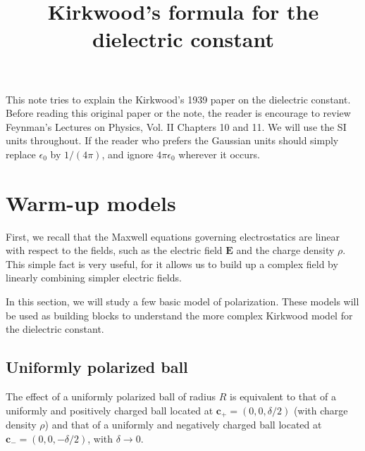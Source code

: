 \documentclass[11pt]{article}
\newcommand{\vct}[1]{\boldsymbol{\mathbf{#1}}}
\newcommand{\vE}{\vct{E}}
\begin{document}
\title{Kirkwood's formula for the dielectric constant}
\author{ \vspace{-10ex} }
\date{ \vspace{-10ex} }
\maketitle


This note tries to explain the Kirkwood's 1939 paper\cite{kirkwood1939a}
on the dielectric constant.
%
Before reading this original paper or the note,
%
the reader is encourage to review Feynman's Lectures on Physics,
Vol. II Chapters 10 and 11.
%
We will use the SI units throughout.
If the reader who prefers the Gaussian units
should simply replace $\epsilon_0$ by $1/(4 \pi)$,
and ignore $4\pi \epsilon_0$ wherever it occurs.



\section{Warm-up models}


First, we recall that the Maxwell equations governing electrostatics
are linear with respect to the fields,
such as the electric field $\vE$ and the charge density $\rho$.
%
This simple fact is very useful,
for it allows us to build up a complex field
by linearly combining simpler electric fields.

In this section,
we will study a few basic model of polarization.
%
These models will be used as building blocks
to understand the more complex Kirkwood model for
the dielectric constant.



\subsection{Uniformly polarized ball}



The effect of a uniformly polarized ball of radius $R$ is equivalent to
that of a uniformly and positively charged ball
located at $\vct c_+ = (0, 0, \delta/2)$ (with charge density $\rho$)
and that of a uniformly and negatively charged ball
located at $\vct c_- = (0, 0, -\delta/2)$,
with $\delta \rightarrow 0$.
\end{document}
